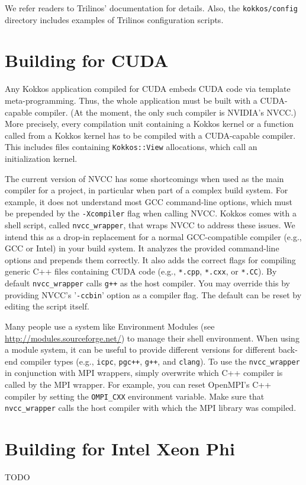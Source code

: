 We refer readers to Trilinos' documentation for details.  Also, the
\texttt{kokkos/config} directory includes examples of Trilinos
configuration scripts.
 
\section{Building for CUDA}\label{S:build:CUDA}

Any Kokkos application compiled for CUDA embeds CUDA code via template meta-programming.
Thus, the whole application must be built with a CUDA-capable compiler.
(At the moment, the only such compiler is NVIDIA's NVCC.)
More precisely, every compilation unit containing a Kokkos kernel or a function called from a Kokkos kernel has to be compiled with a CUDA-capable compiler. 
This includes files containing \lstinline|Kokkos::View| allocations, which call an initialization kernel. 

The current version of NVCC has some shortcomings when used as the main compiler for a project, in particular when part of a complex build system.
For example, it does not understand most GCC command-line options, which must be prepended by the \lstinline|-Xcompiler| flag when calling NVCC. 
Kokkos comes with a shell script, called \lstinline|nvcc_wrapper|, that wraps NVCC to address these issues.
We intend this as a drop-in replacement for a normal GCC-compatible compiler (e.g., GCC or Intel) in your build system.
It analyzes the provided command-line options and prepends them correctly. 
It also adds the correct flags for compiling generic C++ files containing CUDA code (e.g., \verb!*.cpp!, \verb!*.cxx!, or \verb!*.CC!).
By default \lstinline|nvcc_wrapper| calls \verb!g++! as the host compiler.
You may override this by providing NVCC's '\lstinline|-ccbin|' option as a compiler flag.
The default can be reset by editing the script itself. 

Many people use a system like Environment Modules (see \\ \url{http://modules.sourceforge.net/}) to manage their shell environment.
When using a module system, it can be useful to provide different versions for different back-end compiler types (e.g., \verb!icpc!, \verb!pgc++!, \verb!g++!, and \verb!clang!).
To use the \lstinline|nvcc_wrapper| in conjunction with MPI wrappers, simply overwrite which C++ compiler is called by the MPI wrapper. 
For example, you can reset OpenMPI's C++ compiler by setting the \lstinline|OMPI_CXX| environment variable.
Make sure that \lstinline|nvcc_wrapper| calls the host compiler with which the MPI library was compiled.

\section{Building for Intel Xeon Phi}\label{S:build:Phi}

TODO
